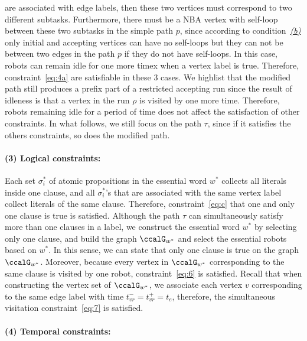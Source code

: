 \documentclass[Afour,sageh,times]{sagej}
\begin{document}
{{are associated with edge labels, then these two vertices must correspond to two different subtasks. Furthermore, there must be a NBA vertex with self-loop between these two subtasks in the simple path $p$, since according to condition~\hyperref[cond:b]{\it (b)} only initial and accepting vertices can have no self-loops but they can not be between two edges in the path $p$ if they do not have self-loops. In this case, robots can remain idle for one more timex  when a vertex label is true. Therefore, constraint~\eqref{eq:4a} are satisfiable in these 3 cases. We highlist that the modified path still produces a prefix part of a restricted accepting run since the result of idleness is  that a vertex in the run $\rho$ is visited by one more time. Therefore,  robots remaining idle for a period of time does not affect the satisfaction of other constraints. In what follows, we still focus on the path $\tau$, since if it satisfies the others constraints, so does the modified path.

\paragraph{(3) Logical constraints:} Each set $\sigma^*_i$ of atomic propositions in the essential word $w^*$ collects all literals inside one clause, and all $\sigma^*_i$'s that are associated with the same vertex label collect literals of the same clause. Therefore, constraint~\eqref{eq:c} that one and only one clause is true is satisfied. Although the path $\tau$ can simultaneously satisfy more than one clauses in a label, we construct the essential word $w^*$ by selecting only one clause, and build the graph $\ccalG_{w^*}$ and select the essential robots based on $w^*$. In this sense, we can state that only one clause is true on the graph $\ccalG_{w^*}$. Moreover, because every vertex in $\ccalG_{w^*}$ corresponding to the same clause is visited by one robot, constraint~\eqref{eq:6} is satisfied. Recall that when constructing the vertex set of $\ccalG_{w^*}$, we associate each vertex $v$ corresponding to the same edge label with time $t_{vr}^- = t_{vr}^+ = t_e$, therefore, the simultaneous visitation constraint~\eqref{eq:7} is satisfied.

\paragraph{(4) Temporal constraints:}
}}
\end{document}
